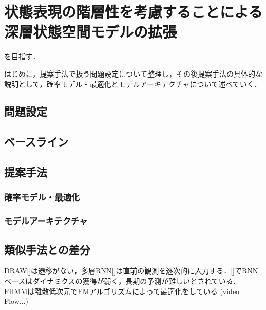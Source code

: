 \chapter{状態表現の階層性を考慮することによる深層状態空間モデルの拡張}
\label{chap:proposal}
を目指す．

はじめに，提案手法で扱う問題設定について整理し，その後提案手法の具体的な説明として，確率モデル・最適化とモデルアーキテクチャについて述べていく．

\section{問題設定}
\section{ベースライン}
\section{提案手法}
\subsection{確率モデル・最適化}
\subsection{モデルアーキテクチャ}
\section{類似手法との差分}
DRAW[]は遷移がない，多層RNN[]は直前の観測を逐次的に入力する．[]でRNNベースはダイナミクスの獲得が弱く，長期の予測が難しいとされている．FHMMは離散低次元でEMアルゴリズムによって最適化をしている
(video Flow...)
